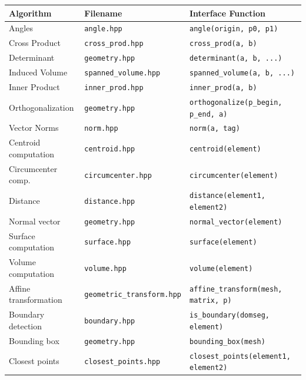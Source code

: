 \begin{table}
 \begin{tabular}{|l|l|l|}
  \hline
   Algorithm & Filename   & Interface Function\\
   \hline
   Angles            & \texttt{angle.hpp}           & \lstinline|angle(origin, p0, p1)| \\
   Cross Product     & \texttt{cross\_prod.hpp}     & \lstinline|cross_prod(a, b)| \\
   Determinant       & \texttt{geometry.hpp}        & \lstinline|determinant(a, b, ...)| \\
   Induced Volume    & \texttt{spanned\_volume.hpp} & \lstinline|spanned_volume(a, b, ...)| \\
   Inner Product     & \texttt{inner\_prod.hpp}     & \lstinline|inner_prod(a, b)|\\
   Orthogonalization & \texttt{geometry.hpp}        & \lstinline|orthogonalize(p_begin, p_end, a)| \\
   Vector Norms      & \texttt{norm.hpp}            & \lstinline|norm(a, tag)| \\
   \hline
   Centroid computation & \texttt{centroid.hpp}           & \lstinline|centroid(element)| \\
   Circumcenter comp.   & \texttt{circumcenter.hpp}       & \lstinline|circumcenter(element)| \\
   Distance             & \texttt{distance.hpp}           & \lstinline|distance(element1, element2)| \\
   Normal vector        & \texttt{geometry.hpp}           & \lstinline|normal_vector(element)| \\
   Surface computation  & \texttt{surface.hpp}            & \lstinline|surface(element)| \\
   Volume computation   & \texttt{volume.hpp}             & \lstinline|volume(element)| \\
   \hline
   Affine transformation & \texttt{geometric\_transform.hpp}  & \lstinline|affine_transform(mesh, matrix, p)| \\
   Boundary detection    & \texttt{boundary.hpp}              & \lstinline|is_boundary(domseg, element)|\\
   Bounding box          & \texttt{geometry.hpp}              & \lstinline|bounding_box(mesh)|\\
   Closest points        & \texttt{closest\_points.hpp}       & \lstinline|closest_points(element1, element2)| \\

\end{tabular}
\end{table}
